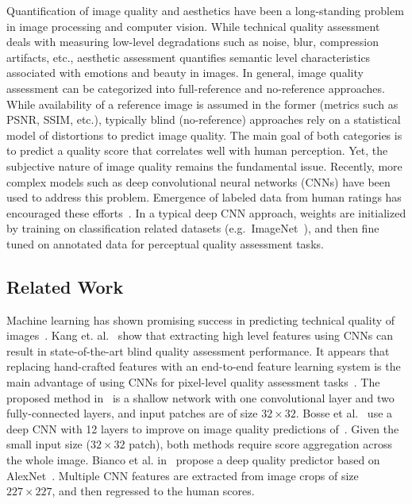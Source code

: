 \documentclass[10pt,twocolumn,twoside]{IEEEtran}
\begin{document}
Quantification of image quality and aesthetics have been a long-standing problem in image processing and computer vision. While technical quality assessment deals with measuring low-level degradations such as noise, blur, compression artifacts, etc., aesthetic assessment quantifies semantic level characteristics associated with emotions and beauty in images. In general, image quality assessment can be categorized into full-reference and no-reference approaches. While availability of a reference image is assumed in the former (metrics such as PSNR, SSIM\cite{wang2004image}, etc.), typically blind (no-reference) approaches rely on a statistical model of distortions to predict image quality. The main goal of both categories is to predict a quality score that correlates well with human perception. Yet, the subjective nature of image quality remains the fundamental issue. Recently, more complex models such as deep convolutional neural networks (CNNs) have been used to address this problem\cite{xue2013learning, kang2014convolutional, bosse2016deep, bianco2016use, lu2015deep, kao2015visual, mai2016composition, jin2016image}. Emergence of labeled data from human ratings has encouraged these efforts~\cite{murray2012ava,ponomarenko2013color,sheikh2005live,larson2010most,kong2016photo}. In a typical deep CNN approach, weights are initialized by training on classification related datasets (e.g.\ ImageNet~\cite{krizhevsky2012imagenet}), and then fine tuned on annotated data for perceptual quality assessment tasks.

 \subsection{Related Work}
Machine learning has shown promising success in predicting technical quality of images~\cite{xue2013learning, kang2014convolutional, bosse2016deep, bianco2016use}. Kang et. al.~\cite{kang2014convolutional} show that extracting high level features using CNNs can result in state-of-the-art blind quality assessment performance. It appears that replacing hand-crafted features with an end-to-end feature learning system is the main advantage of using CNNs for pixel-level quality assessment tasks~\cite{kang2014convolutional, bosse2016deep}. The proposed method in~\cite{kang2014convolutional} is a shallow network with one convolutional layer and two fully-connected layers, and input patches are of size $32\times32$. Bosse et al.~\cite{bosse2016deep} use a deep CNN with 12 layers to improve on image quality predictions of~\cite{kang2014convolutional}. Given the small input size ($32\times32$ patch), both methods require score aggregation across the whole image. Bianco et al. in~\cite{bianco2016use} propose a deep quality predictor based on AlexNet~\cite{krizhevsky2012imagenet}. Multiple CNN features are extracted from image crops of size $227\times227$, and then regressed to the human scores.
\end{document}

